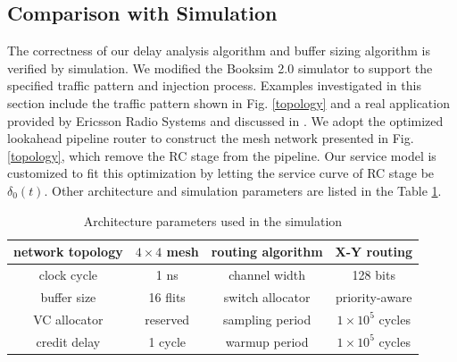 \documentclass[preprint]{elsarticle}
\begin{document}
\subsection{Comparison with Simulation}\label{sim}
The correctness of our delay analysis algorithm and buffer sizing algorithm is verified by simulation. We modified the Booksim 2.0 simulator \cite{6557149} to support the specified traffic pattern and injection process. Examples investigated in this section include the traffic pattern shown in Fig. \ref{topology} and a real application provided by Ericsson Radio Systems and discussed in \cite{LuJa08}\cite{Jafari1922089}. We adopt the optimized lookahead pipeline router  \cite{jerger2009chip} to construct the mesh network presented in Fig. \ref{topology}, which remove the RC stage from the pipeline. Our service model is customized to fit this optimization by letting the service curve of RC stage be $\delta_0(t)$. Other architecture and simulation parameters are listed in the Table \ref{arcpara}.
\begin{table}[htbp]
\centering
\caption{\label{arcpara}Architecture parameters used in the simulation}
\begin{tabular}{|c|c||c|c|}
\hline
network topology    & $4\times 4$ mesh  &   routing algorithm & X-Y routing\\
\hline
clock cycle   & 1 ns &   channel width   & 128 bits\\
\hline
buffer size &   16 flits  &   switch allocator    &   priority-aware\\
\hline
VC allocator    &   reserved    & sampling period &   $1\times 10^5$ cycles\\
\hline
credit delay &  1 cycle   &  warmup period  & $1\times 10^5$ cycles \\
\hline
\end{tabular}
\end{table}
\end{document}
